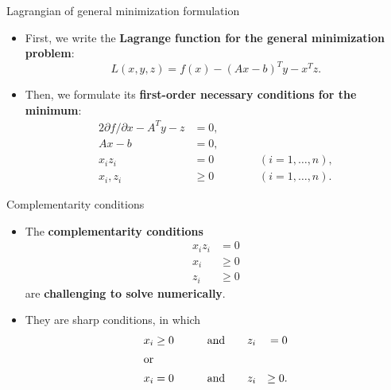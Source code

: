 %
\begin{frame}{Lagrangian of general minimization formulation}

\small
\begin{itemize}[<+->]
\item First, we write the {\bf Lagrange function for the general minimization problem}:
\[
L(x,y,z)=f(x)-(Ax-b)^{T}y-x^{T}z.
\]
\item Then, we formulate its \textbf{first-order necessary conditions for the minimum}:
%
\begin{alignat*}{2}
\partial f/\partial x-A^{T}y-z & =0, & \qquad\\
Ax-b & =0,\\
x_{i}z_{i} & =0 &  & (i=1,\ldots,n),\\
x_{i},z_{i} & \geq0 &  & (i=1,\ldots,n).
\end{alignat*}
%
\end{itemize}
\end{frame}
%
%
\begin{frame}{Complementarity conditions}

\begin{itemize}
\item The \alert{\bf complementarity conditions}
\begin{align*}
x_{i}z_{i} & =0\\
x_{i} & \geq0\\
z_{i} & \geq0
\end{align*}
 are {\bf challenging to solve numerically}.
\item They are sharp conditions, in which
\begin{alignat*}{3}
x_{i} & \geq0 & \qquad\text{and}\qquad & z_{i} & =0\\
\shortintertext{or}x_{i} & =0 & \qquad\text{and}\qquad & z_{i} & \geq0.
\end{alignat*}

\end{itemize}
\end{frame}
%
